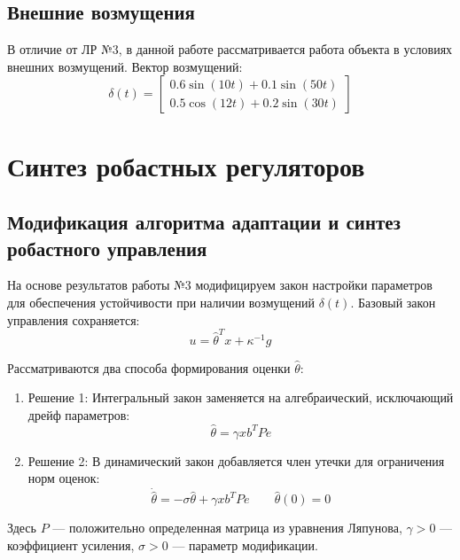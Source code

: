 \documentclass[a4paper,12pt]{article}
\begin{document}
	\subsection{Внешние возмущения}
	В отличие от ЛР №3, в данной работе рассматривается работа объекта в условиях внешних возмущений. Вектор возмущений:
	\begin{equation}
		\delta(t) = \begin{bmatrix} 0.6\sin(10t) + 0.1\sin(50t) \\ 0.5\cos(12t) + 0.2\sin(30t) \end{bmatrix}
	\end{equation}
	
	
	
	\newpage
	
	\section{Синтез робастных регуляторов}
	
	\subsection{Модификация алгоритма адаптации и синтез робастного управления}
	
	На основе результатов работы №3 модифицируем закон настройки параметров для обеспечения устойчивости при наличии возмущений $\delta(t)$. Базовый закон управления сохраняется:
	\begin{equation}
		u = \hat{\theta}^T x + \kappa^{-1} g
	\end{equation}
	
	Рассматриваются два способа формирования оценки $\hat{\theta}$:
	
	
	\begin{enumerate}
		\item Решение 1:  Интегральный закон заменяется на алгебраический, исключающий дрейф параметров:
		\begin{equation}
			\hat{\theta} = \gamma x b^T P e
		\end{equation}
		
		\item Решение 2: В динамический закон добавляется член утечки для ограничения норм оценок:
		\begin{equation}
			\dot{\hat{\theta}} = -\sigma \hat{\theta} + \gamma x b^T P e \qquad \hat{\theta}(0) = 0
		\end{equation}
		
	\end{enumerate}
	Здесь $P$ --- положительно определенная матрица из уравнения Ляпунова, $\gamma > 0$ --- коэффициент усиления, $\sigma > 0$ --- параметр модификации.
	
\end{document}
